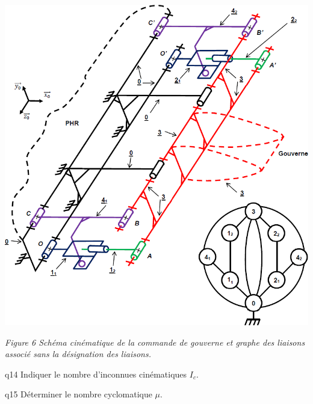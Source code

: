 \begin{multicols}{2}
\begin{center}
\includegraphics[width=\linewidth]{images/fig_07}

\textit{Figure 6 Schéma cinématique de la commande de gouverne et graphe
des liaisons associé sans la désignation des liaisons.}
\end{center}




{\begin{question}{q14}
Indiquer le nombre d’inconnues cinématiques $I_c$.
\ifprof
\begin{corrige}
\end{corrige}
\else
\fi
\begin{reponses}
\end{reponses} \end{question}}  


{\begin{question}{q15}
Déterminer le nombre cyclomatique $\mu$.
\ifprof
\begin{corrige}
\end{corrige}
\else
\fi
\begin{reponses}
\end{reponses} \end{question}}  



\end{multicols}
